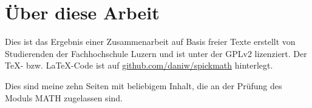 



\chapter*{Über diese Arbeit}
Dies ist das Ergebnis einer Zusammenarbeit auf Basis freier Texte erstellt von Studierenden der Fachhochschule Luzern und ist unter der GPLv2 lizenziert. Der \TeX - bzw. \LaTeX -Code ist auf \url{github.com/daniw/spickmath} hinterlegt. 

Dies sind meine zehn Seiten mit beliebigem Inhalt, die an der Prüfung des Moduls MATH zugelassen sind. 




